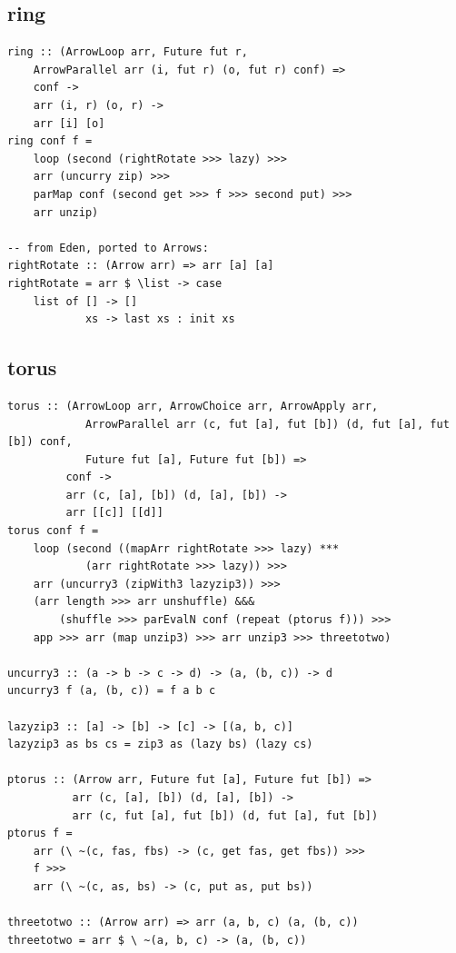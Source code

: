 \subsection{ring}

\begin{lstlisting}[frame=htrbl]
ring :: (ArrowLoop arr, Future fut r,
	ArrowParallel arr (i, fut r) (o, fut r) conf) =>
    conf ->
    arr (i, r) (o, r) ->
    arr [i] [o]
ring conf f =
	loop (second (rightRotate >>> lazy) >>>
    arr (uncurry zip) >>>
    parMap conf (second get >>> f >>> second put) >>>
    arr unzip)

-- from Eden, ported to Arrows:
rightRotate :: (Arrow arr) => arr [a] [a]
rightRotate = arr $ \list -> case
	list of [] -> []
			xs -> last xs : init xs
\end{lstlisting}

\subsection{torus}

\begin{lstlisting}[frame=htrbl]
torus :: (ArrowLoop arr, ArrowChoice arr, ArrowApply arr,
            ArrowParallel arr (c, fut [a], fut [b]) (d, fut [a], fut [b]) conf,
            Future fut [a], Future fut [b]) =>
         conf ->
         arr (c, [a], [b]) (d, [a], [b]) ->
         arr [[c]] [[d]]
torus conf f =
	loop (second ((mapArr rightRotate >>> lazy) ***
			(arr rightRotate >>> lazy)) >>>
    arr (uncurry3 (zipWith3 lazyzip3)) >>>
    (arr length >>> arr unshuffle) &&&
        (shuffle >>> parEvalN conf (repeat (ptorus f))) >>>
    app >>> arr (map unzip3) >>> arr unzip3 >>> threetotwo)

uncurry3 :: (a -> b -> c -> d) -> (a, (b, c)) -> d
uncurry3 f (a, (b, c)) = f a b c

lazyzip3 :: [a] -> [b] -> [c] -> [(a, b, c)]
lazyzip3 as bs cs = zip3 as (lazy bs) (lazy cs)

ptorus :: (Arrow arr, Future fut [a], Future fut [b]) =>
          arr (c, [a], [b]) (d, [a], [b]) ->
          arr (c, fut [a], fut [b]) (d, fut [a], fut [b])
ptorus f =
	arr (\ ~(c, fas, fbs) -> (c, get fas, get fbs)) >>>
	f >>>
	arr (\ ~(c, as, bs) -> (c, put as, put bs))

threetotwo :: (Arrow arr) => arr (a, b, c) (a, (b, c))
threetotwo = arr $ \ ~(a, b, c) -> (a, (b, c))
\end{lstlisting}

